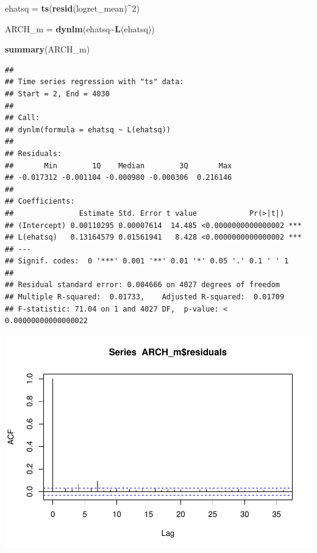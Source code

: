 \documentclass[
]{book}
\newenvironment{Shaded}{\begin{snugshade}}{\end{snugshade}}
\newcommand{\DecValTok}[1]{\textcolor[rgb]{0.00,0.00,0.81}{#1}}
\newcommand{\FunctionTok}[1]{\textcolor[rgb]{0.13,0.29,0.53}{\textbf{#1}}}
\newcommand{\NormalTok}[1]{#1}
\newcommand{\OtherTok}[1]{\textcolor[rgb]{0.56,0.35,0.01}{#1}}
\newcommand{\SpecialCharTok}[1]{\textcolor[rgb]{0.81,0.36,0.00}{\textbf{#1}}}
\begin{document}
\begin{Shaded}
\begin{Highlighting}[]
\NormalTok{ehatsq }\OtherTok{=} \FunctionTok{ts}\NormalTok{(}\FunctionTok{resid}\NormalTok{(logret\_mean)}\SpecialCharTok{\^{}}\DecValTok{2}\NormalTok{)}

\NormalTok{ARCH\_m }\OtherTok{=} \FunctionTok{dynlm}\NormalTok{(ehatsq}\SpecialCharTok{\textasciitilde{}}\FunctionTok{L}\NormalTok{(ehatsq))}

\FunctionTok{summary}\NormalTok{(ARCH\_m)}
\end{Highlighting}
\end{Shaded}

\begin{verbatim}
## 
## Time series regression with "ts" data:
## Start = 2, End = 4030
## 
## Call:
## dynlm(formula = ehatsq ~ L(ehatsq))
## 
## Residuals:
##       Min        1Q    Median        3Q       Max 
## -0.017312 -0.001104 -0.000980 -0.000306  0.216146 
## 
## Coefficients:
##               Estimate Std. Error t value            Pr(>|t|)    
## (Intercept) 0.00110295 0.00007614  14.485 <0.0000000000000002 ***
## L(ehatsq)   0.13164579 0.01561941   8.428 <0.0000000000000002 ***
## ---
## Signif. codes:  0 '***' 0.001 '**' 0.01 '*' 0.05 '.' 0.1 ' ' 1
## 
## Residual standard error: 0.004666 on 4027 degrees of freedom
## Multiple R-squared:  0.01733,    Adjusted R-squared:  0.01709 
## F-statistic: 71.04 on 1 and 4027 DF,  p-value: < 0.00000000000000022
\end{verbatim}

\begin{Shaded}
\end{Shaded}

\includegraphics{Notas-Series-Tiempo_files/figure-latex/ArchTest-1.pdf}
\end{document}
